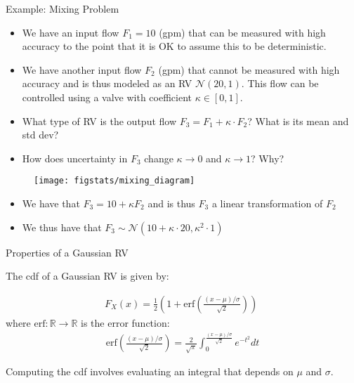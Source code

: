 \documentclass[9pt]{beamer}
\begin{document}
\begin{frame}{Example: Mixing Problem}
\begin{itemize}
\item We have an input flow  $F_1=10$ (gpm) that can be measured with high accuracy to the point that it is OK to assume this to be deterministic. 
\item We have another input flow $F_2$ (gpm) that cannot be measured with high accuracy and is thus modeled as an RV $\mathcal{N}(20,1)$. This flow can be controlled using a valve with coefficient $\kappa \in [0,1]$. 
\end{itemize}
\begin{block}{}
\begin{itemize}
\item What type of RV is the output flow $F_3=F_1+\kappa\cdot F_2$? What is its mean and std dev?
\item How does uncertainty in $F_3$ change $\kappa\to 0$ and $\kappa\to 1$? Why?
\end{itemize}
\end{block}
\begin{figure}[!htb]
    \centering
	\texttt{[image: figstats/mixing\_diagram]}
\end{figure}
\begin{itemize}
\item We have that $F_3=10+\kappa F_2$ and is thus $F_3$ a linear transformation of $F_2$
\item We thus have that $F_3\sim\mathcal{N}(10+\kappa\cdot 20,\kappa^2\cdot 1)$
\end{itemize}
\end{frame}


%
\begin{frame}{Properties of a Gaussian RV}

The cdf of a Gaussian RV is given by:
\begin{block}{}
\begin{align*}
F_X(x)=\frac{1}{2}\left(1+\textrm{erf}\left(\frac{(x-\mu)/\sigma}{\sqrt{2}}\right)\right)\; 
\end{align*}
where $\textrm{erf}:\mathbb{R}\to \mathbb{R}$ is the error function:
\begin{align*}
\textrm{erf}\left(\frac{(x-\mu)/\sigma}{\sqrt{2}}\right)=\frac{2}{\sqrt{\pi}}\int_0^{\frac{(x-\mu)/\sigma}{\sqrt{2}}}e^{-t^2}dt
\end{align*}
\end{block}
Computing the cdf involves evaluating an integral that depends on $\mu$ and $\sigma$. 

\end{frame}
\end{document}
